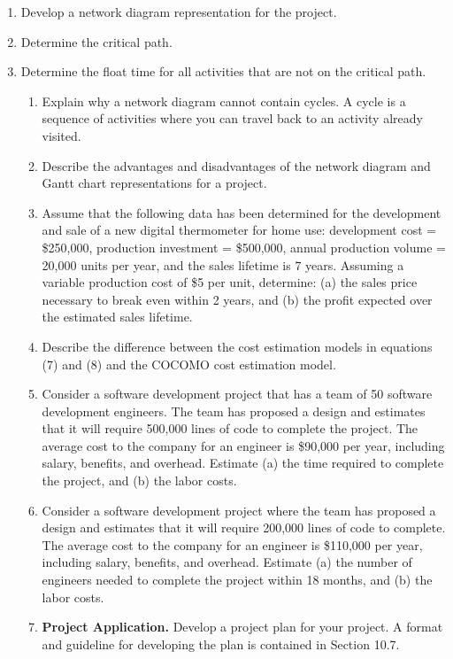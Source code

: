 \begin{enumerate}
\def\labelenumi{\alph{enumi})}
\item
  Develop a network diagram representation for the project.
\item
  Determine the critical path.
\item
  Determine the float time for all activities that are not on the
  critical path.

  \begin{enumerate}
  \def\labelenumii{\arabic{enumii}.}
  \item
    Explain why a network diagram cannot contain cycles. A cycle is a
    sequence of activities where you can travel back to an activity
    already visited.
  \item
    Describe the advantages and disadvantages of the network diagram and
    Gantt chart representations for a project.
  \item
    Assume that the following data has been determined for the
    development and sale of a new digital thermometer for home use:
    development cost = \$250,000, production investment = \$500,000,
    annual production volume = 20,000 units per year, and the sales
    lifetime is 7 years. Assuming a variable production cost of \$5 per
    unit, determine: (a) the sales price necessary to break even within
    2 years, and (b) the profit expected over the estimated sales
    lifetime.
  \item
    Describe the difference between the cost estimation models in
    equations (7) and (8) and the COCOMO cost estimation model.
  \item
    Consider a software development project that has a team of 50
    software development engineers. The team has proposed a design and
    estimates that it will require 500,000 lines of code to complete the
    project. The average cost to the company for an engineer is \$90,000
    per year, including salary, benefits, and overhead. Estimate (a) the
    time required to complete the project, and (b) the labor costs.
  \item
    Consider a software development project where the team has proposed
    a design and estimates that it will require 200,000 lines of code to
    complete. The average cost to the company for an engineer is
    \$110,000 per year, including salary, benefits, and overhead.
    Estimate (a) the number of engineers needed to complete the project
    within 18 months, and (b) the labor costs.
  \item
    \textbf{Project Application.} Develop a project plan for your
    project. A format and guideline for developing the plan is contained
    in Section 10.7.
  \end{enumerate}
\end{enumerate}
